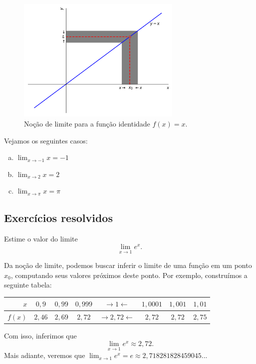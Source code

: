 \begin{figure}[H]
  \centering
  \includegraphics[width=0.7\textwidth]{./cap_lim/dados/fig_lim_funid/fig_lim_funid}
  \caption{Noção de limite para a função identidade $f(x)=x$.}
  \label{fig:lim_funid}
\end{figure}

\begin{ex}
  Vejamos os seguintes casos:
  \begin{enumerate}[a)]
  \item $\displaystyle \lim_{x\to -1} x = -1$
  \item $\displaystyle \lim_{x\to 2} x = 2$
  \item $\displaystyle \lim_{x\to \pi} x = \pi$
  \end{enumerate}
\end{ex}

\subsection*{Exercícios resolvidos}

\begin{exeresol}
  Estime o valor do limite
  \begin{equation}
    \lim_{x\to 1} e^x.
  \end{equation}
\end{exeresol}
\begin{resol}
  Da noção de limite, podemos buscar inferir o limite de uma função em um ponto $x_0$, computando seus valores próximos deste ponto. Por exemplo, construímos a seguinte tabela:
  
  \begin{tabular}{r|ccc|c|ccc}
    $x$ & $0,9$ & $0,99$ & $0,999$ & $\rightarrow 1 \leftarrow$ & $1,0001$ & $1,001$ & $1,01$\\\hline
    $f(x)$ & $2,46$ & $2,69$ & $2,72$ & $\rightarrow 2,72 \leftarrow$ & $2,72$ & $2,72$ & $2,75$
  \end{tabular}
  
  Com isso, inferimos que
  \begin{equation}
    \lim_{x\to 1} e^x \approx 2,72.
  \end{equation}
  Mais adiante, veremos que $\lim_{x\to 1} e^x = e \approx 2,718281828459045 ...$
\end{resol}

